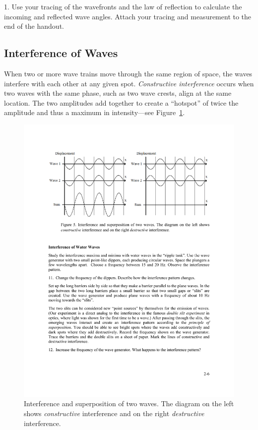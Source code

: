 \documentclass[11pt]{NSF}
\begin{document}
1.	 Use your tracing of the wavefronts and the law of reflection to calculate the incoming and reflected wave angles. Attach your tracing and measurement to the end of the handout.


\subsection{Interference of Waves}

When two or more wave trains move through the same region of space, the waves
interfere with each other at any given spot. 
{\em Constructive interference} occurs
when two waves with the same phase, such as two wave crests, align at the same
location. The two amplitudes add together to create a ``hotspot” of twice the
amplitude and thus a maximum in intensity---see Figure~\ref{f:5}.
%
\begin{figure}[hbtp]
\begin{center}
\includegraphics[width=.95\textwidth]{fig2_5}
\caption{Interference and superposition of two waves. 
The diagram on the left
shows {\em constructive} interference and on the right 
{\em destructive} interference.}
\label{f:5}
\end{center}
\end{figure}
%
\end{document}
